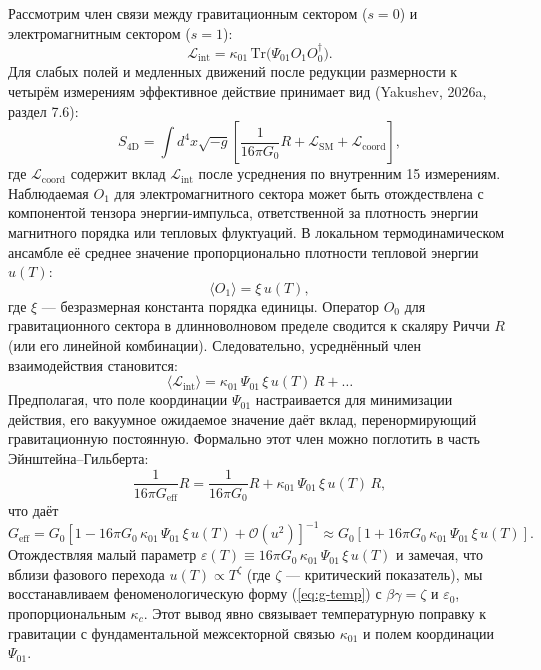 \documentclass[12pt]{article}
\theoremstyle{remark}
\newcommand{\eps}{\varepsilon}
\newcommand{\kappac}{\kappa_c}
\newcommand{\lagr}{\mathcal{L}}
\begin{document}
	Рассмотрим член связи между гравитационным сектором ($s=0$) и электромагнитным сектором ($s=1$):
	\begin{equation}
		\lagr_{\text{int}} = \kappa_{01} \, \mathrm{Tr}\big(\Psi_{01} O_1 O_0^\dagger\big).
	\end{equation}
	Для слабых полей и медленных движений после редукции размерности к четырём измерениям эффективное действие принимает вид (Yakushev, 2026a, раздел 7.6):
	\begin{equation}
		S_{\text{4D}} = \int d^4x \sqrt{-g} \left[ \frac{1}{16\pi G_0} R + \mathcal{L}_{\text{SM}} + \mathcal{L}_{\text{coord}} \right],
	\end{equation}
	где $\mathcal{L}_{\text{coord}}$ содержит вклад $\lagr_{\text{int}}$ после усреднения по внутренним 15 измерениям. Наблюдаемая $O_1$ для электромагнитного сектора может быть отождествлена с компонентой тензора энергии-импульса, ответственной за плотность энергии магнитного порядка или тепловых флуктуаций. В локальном термодинамическом ансамбле её среднее значение пропорционально плотности тепловой энергии $u(T)$:
	\begin{equation}
		\langle O_1 \rangle = \xi \, u(T),
	\end{equation}
	где $\xi$ — безразмерная константа порядка единицы. Оператор $O_0$ для гравитационного сектора в длинноволновом пределе сводится к скаляру Риччи $R$ (или его линейной комбинации). Следовательно, усреднённый член взаимодействия становится:
	\begin{equation}
		\langle \lagr_{\text{int}} \rangle = \kappa_{01} \, \Psi_{01} \, \xi \, u(T) \, R + \dots
	\end{equation}
	Предполагая, что поле координации $\Psi_{01}$ настраивается для минимизации действия, его вакуумное ожидаемое значение даёт вклад, перенормирующий гравитационную постоянную. Формально этот член можно поглотить в часть Эйнштейна–Гильберта:
	\begin{equation}
		\frac{1}{16\pi G_{\text{eff}}} R = \frac{1}{16\pi G_0} R + \kappa_{01} \, \Psi_{01} \, \xi \, u(T) \, R,
	\end{equation}
	что даёт
	\begin{equation}
		G_{\text{eff}} = G_0 \left[ 1 - 16\pi G_0 \, \kappa_{01} \, \Psi_{01} \, \xi \, u(T) + \mathcal{O}(u^2) \right]^{-1} \approx G_0 \left[ 1 + 16\pi G_0 \, \kappa_{01} \, \Psi_{01} \, \xi \, u(T) \right].
	\end{equation}
	Отождествляя малый параметр $\eps(T) \equiv 16\pi G_0 \, \kappa_{01} \, \Psi_{01} \, \xi \, u(T)$ и замечая, что вблизи фазового перехода $u(T) \propto T^{\zeta}$ (где $\zeta$ — критический показатель), мы восстанавливаем феноменологическую форму (\ref{eq:g-temp}) с $\beta\gamma = \zeta$ и $\eps_0$, пропорциональным $\kappac$. Этот вывод явно связывает температурную поправку к гравитации с фундаментальной межсекторной связью $\kappa_{01}$ и полем координации $\Psi_{01}$.
	
\end{document}
